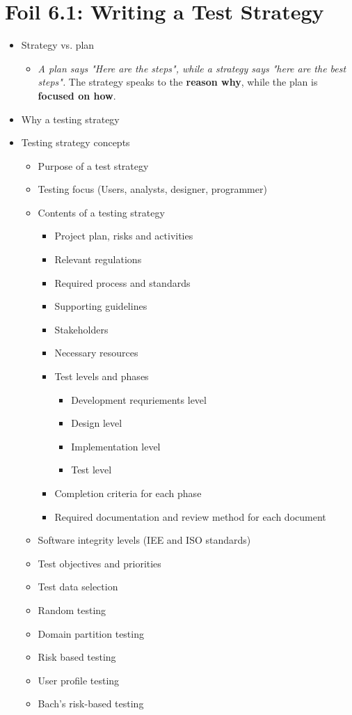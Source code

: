 	\section{Foil 6.1: Writing a Test Strategy}
		\begin{itemize}
			\item Strategy vs. plan
				\begin{itemize}	
					\item {\it A plan says "Here are the steps", while a strategy says
					"here are the best steps".} The strategy speaks to the {\bf reason why},
					while the plan is {\bf focused on how}.
				\end{itemize}	
			\item Why a testing strategy
			\item Testing strategy concepts
				\begin{itemize}
					\item Purpose of a test strategy
					\item Testing focus (Users, analysts, designer, programmer)
					\item Contents of a testing strategy
						\begin{itemize}
							\item Project plan, risks and activities
							\item Relevant regulations
							\item Required process and standards
							\item Supporting guidelines
							\item Stakeholders
							\item Necessary resources
							\item Test levels and phases
								\begin{itemize}
									\item Development requriements level
									\item Design level
									\item Implementation level
									\item Test level
								\end{itemize}
							\item Completion criteria for each phase
							\item Required documentation and review method for each document
						\end{itemize}
					\item Software integrity levels (IEE and ISO standards)
					\item Test objectives and priorities
					\item Test data selection
					\item Random testing
					\item Domain partition testing
					\item Risk based testing
					\item User profile testing
					\item Bach's risk-based testing
				\end{itemize}
		\end{itemize}


